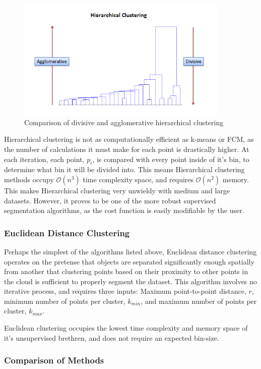 \documentclass[12pt]{drexelthesis}
\let\Oldsubsubsection\subsubsection
\renewcommand{\subsubsection}{\FloatBarrier\Oldsubsubsection}
\begin{document}
\begin{figure}[!ht]
\centering
\includegraphics[width=4in]{divisiveAgglomerative.png}
\caption[Comparison of divisive and agglomerative clustering methods]{Comparison of divisive and agglomerative hierarchical clustering}
\end{figure}

Hierarchical clustering is not as computationally efficient as k-means or FCM, as the number of calculations it must make for each point is drastically higher. At each iteration, each point, $p_{i}$, is compared with every point inside of it's bin, to determine what bin it will be divided into. This means Hierarchical clustering methods occupy $\mathcal{O}(n^{3})$ time complexity space, and requires $\mathcal{O}(n^{2})$ memory. This makes Hierarchical clustering very unwieldy with medium and large datasets. However, it proves to be one of the more robust supervised segmentation algorithms, as the cost function is easily modifiable by the user.


\subsubsection{Euclidean Distance Clustering}
Perhaps the simplest of the algorithms listed above, Euclidean distance clustering operates on the pretense that objects are separated significantly enough spatially from another that clustering points based on their proximity to other points in the cloud is sufficient to properly segment the dataset. This algorithm involves no iterative process, and requires three inputs: Maximum point-to-point distance, $r$, minimum number of points per cluster, $k_{min}$, and maximum number of points per cluster, $k_{max}$.

Euclidean clustering occupies the lowest time complexity and memory space of it's unsupervised brethren, and does not require an expected bin-size.

\subsubsection{Comparison of Methods}
\end{document}

